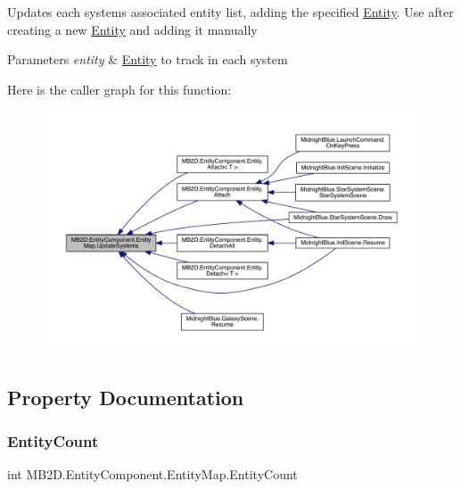 Updates each systems associated entity list, adding the specified \hyperlink{class_m_b2_d_1_1_entity_component_1_1_entity}{Entity}. Use after creating a new \hyperlink{class_m_b2_d_1_1_entity_component_1_1_entity}{Entity} and adding it manually 


\begin{DoxyParams}{Parameters}
{\em entity} & \hyperlink{class_m_b2_d_1_1_entity_component_1_1_entity}{Entity} to track in each system\\
\hline
\end{DoxyParams}
Here is the caller graph for this function\+:
\nopagebreak
\begin{figure}[H]
\begin{center}
\leavevmode
\includegraphics[width=350pt]{class_m_b2_d_1_1_entity_component_1_1_entity_map_ab6078e0b6eddb220b9bbf5d358d6e365_icgraph}
\end{center}
\end{figure}


\subsection{Property Documentation}
\hypertarget{class_m_b2_d_1_1_entity_component_1_1_entity_map_a607d25be9724ca759ecef96fe76ee516}{}\label{class_m_b2_d_1_1_entity_component_1_1_entity_map_a607d25be9724ca759ecef96fe76ee516} 
\subsubsection{\texorpdfstring{Entity\+Count}{EntityCount}}
{\footnotesize\ttfamily int M\+B2\+D.\+Entity\+Component.\+Entity\+Map.\+Entity\+Count\hspace{0.3cm}{\ttfamily [get]}}



